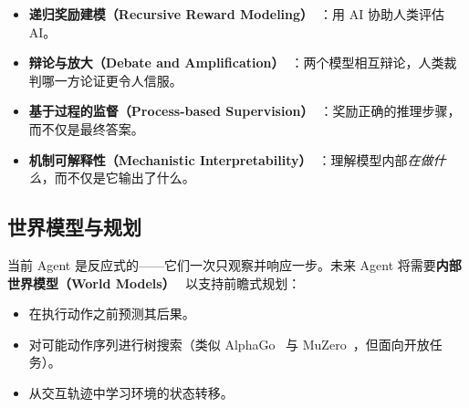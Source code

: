 \begin{itemize}
  \item \textbf{递归奖励建模（Recursive Reward Modeling）}~\cite{christiano2017deep}：用 AI 协助人类评估 AI。
  \item \textbf{辩论与放大（Debate and Amplification）}~\cite{irving2018debate}：两个模型相互辩论，人类裁判哪一方论证更令人信服。
  \item \textbf{基于过程的监督（Process-based Supervision）}~\cite{lightman2023lets}：奖励正确的推理步骤，而不仅是最终答案。
  \item \textbf{机制可解释性（Mechanistic Interpretability）}~\cite{olsson2022context}：理解模型内部\emph{在做什么}，而不仅是它输出了什么。
\end{itemize}

\subsection{世界模型与规划}
\label{world-models-and-planning}

当前 Agent 是反应式的——它们一次只观察并响应一步。未来 Agent 将需要\textbf{内部世界模型（World Models）}~\cite{hafner2020dream} 以支持前瞻式规划：

\begin{itemize}
  \item 在执行动作之前预测其后果。
  \item 对可能动作序列进行树搜索（类似 AlphaGo~\cite{silver2016mastering} 与 MuZero~\cite{schrittwieser2020mastering}，但面向开放任务）。
  \item 从交互轨迹中学习环境的状态转移。
\end{itemize}

